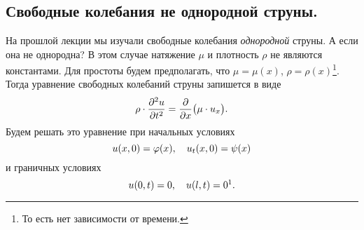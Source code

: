 	\chapter{}
\label{lecture13}
\section{Свободные колебания не однородной струны.}
\label{lecture13section1}
На прошлой лекции мы изучали свободные колебания \emph{однородной} струны. А если она не однородна? В этом случае натяжение $\mu$ и плотность $\rho$ не являются константами. Для простоты будем предполагать, что $\mu=\mu(x)$, $\rho=\rho(x)$\footnote[1]{То есть нет зависимости от времени.}. Тогда уравнение свободных колебаний струны запишется в виде
\begin{equation}\label{l13:eq:1}
	\hfill\rho\cdot\pdder{u}{t}=\pder{}{x}\big(\mu\cdot u_x\big).\hfill
\end{equation}
Будем решать это уравнение при начальных условиях
\begin{equation}\label{l13:eq:2}
	\hfill u(x,0)=\phi(x),\quad u_t(x,0)=\psi(x)\hfill
\end{equation}
и граничных условиях
\begin{equation}\label{l13:eq:3}
	\hfill u(0,t)=0,\quad u(l,t)=0\footnotemark{}.\hfill
\end{equation}


